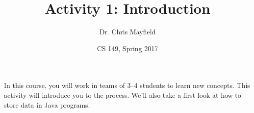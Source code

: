 \documentclass[12pt]{article}
\title{Activity 1: Introduction}
\author{Dr. Chris Mayfield}
\date{CS 149, Spring 2017}
\begin{document}
\maketitle

In this course, you will work in teams of 3--4 students to learn new concepts.
This activity will introduce you to the process.
We'll also take a first look at how to store data in Java programs.




\smallskip

\end{document}
